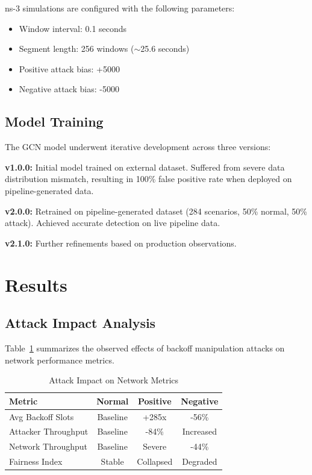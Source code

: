 \documentclass[conference]{IEEEtran}
\begin{document}
ns-3 simulations are configured with the following parameters:

\begin{itemize}
    \item Window interval: 0.1 seconds
    \item Segment length: 256 windows ($\sim$25.6 seconds)
    \item Positive attack bias: +5000
    \item Negative attack bias: -5000
\end{itemize}

\subsection{Model Training}

The GCN model underwent iterative development across three versions:

\textbf{v1.0.0:} Initial model trained on external dataset. Suffered from severe data distribution mismatch, resulting in 100\% false positive rate when deployed on pipeline-generated data.

\textbf{v2.0.0:} Retrained on pipeline-generated dataset (284 scenarios, 50\% normal, 50\% attack). Achieved accurate detection on live pipeline data.

\textbf{v2.1.0:} Further refinements based on production observations.

\section{Results}
\label{sec:results}

\subsection{Attack Impact Analysis}

Table~\ref{tab:attack-impact} summarizes the observed effects of backoff manipulation attacks on network performance metrics.

\begin{table}[htbp]
\caption{Attack Impact on Network Metrics}
\label{tab:attack-impact}
\centering
\begin{tabular}{|l|c|c|c|}
\hline
\textbf{Metric} & \textbf{Normal} & \textbf{Positive} & \textbf{Negative} \\
\hline
Avg Backoff Slots & Baseline & +285x & -56\% \\
Attacker Throughput & Baseline & -84\% & Increased \\
Network Throughput & Baseline & Severe & -44\% \\
Fairness Index & Stable & Collapsed & Degraded \\
\hline
\end{tabular}
\end{table}
\end{document}
